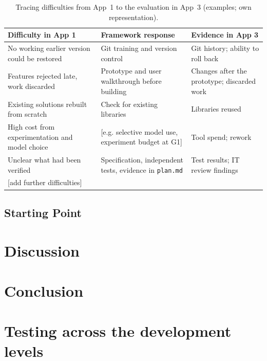 \documentclass[10pt,a4paper]{article}
\begin{document}
\begin{table}[H]
\centering\small
\caption{Tracing difficulties from App~1 to the evaluation in App~3 (examples; own representation).}
\label{tab:traceability}
\begin{tabular}{@{}p{.30\linewidth}p{.30\linewidth}p{.32\linewidth}@{}}
\toprule
\textbf{Difficulty in App 1} & \textbf{Framework response} & \textbf{Evidence in App 3} \\
\midrule
No working earlier version could be restored & Git training and version control & Git history; ability to roll back \\
\addlinespace
Features rejected late, work discarded & Prototype and user walkthrough before building & Changes after the prototype; discarded work \\
\addlinespace
Existing solutions rebuilt from scratch & Check for existing libraries & Libraries reused \\
\addlinespace
High cost from experimentation and model choice & {[e.g. selective model use, experiment budget at G1]} & Tool spend; rework \\
\addlinespace
Unclear what had been verified & Specification, independent tests, evidence in \texttt{plan.md} & Test results; IT review findings \\
\addlinespace
{[add further difficulties]} & & \\
\bottomrule
\end{tabular}
\end{table}
 

\subsection{Starting Point}
\label{sec:starting-point}


\section{Discussion}


\section{Conclusion}


\newpage

\printbibliography


\appendix

\section{Testing across the development levels}
\label{app:testing-overview}
\end{document}
